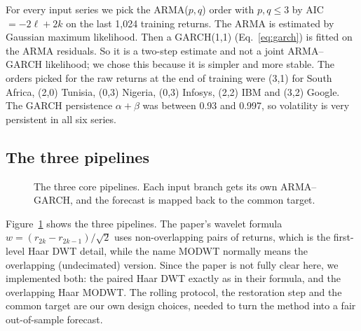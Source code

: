\documentclass{article}
\begin{document}
For every input series we pick the ARMA($p,q$) order with $p,q\le3$ by AIC $=-2\ell+2k$ \cite{akaike1974} on the last 1,024 training returns. The ARMA is estimated by Gaussian maximum likelihood. Then a GARCH(1,1) (Eq.~\ref{eq:garch}) is fitted on the ARMA residuals. So it is a two-step estimate and not a joint ARMA--GARCH likelihood; we chose this because it is simpler and more stable. The orders picked for the raw returns at the end of training were (3,1) for South Africa, (2,0) Tunisia, (0,3) Nigeria, (0,3) Infosys, (2,2) IBM and (3,2) Google. The GARCH persistence $\alpha+\beta$ was between 0.93 and 0.997, so volatility is very persistent in all six series.

\subsection{The three pipelines}

\begin{figure}[t]
\centering
{}
\caption{The three core pipelines. Each input branch gets its own ARMA--GARCH, and the forecast is mapped back to the common target.}
\label{fig:pipe}
\end{figure}

Figure~\ref{fig:pipe} shows the three pipelines. The paper's wavelet formula $w=(r_{2k}-r_{2k-1})/\sqrt2$ uses non-overlapping pairs of returns, which is the first-level Haar DWT detail, while the name MODWT normally means the overlapping (undecimated) version. Since the paper is not fully clear here, we implemented both: the paired Haar DWT exactly as in their formula, and the overlapping Haar MODWT. The rolling protocol, the restoration step and the common target are our own design choices, needed to turn the method into a fair out-of-sample forecast.
\end{document}
